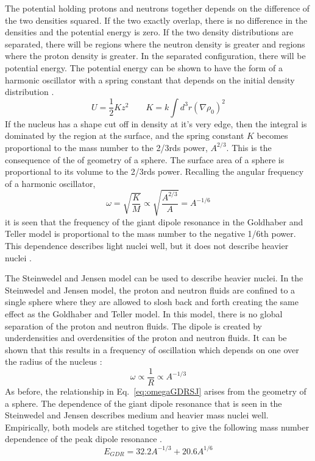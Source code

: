     The potential holding protons and neutrons together depends on the 
      difference of the two densities squared.
    If the two exactly overlap, there is no difference in the densities and the
      potential energy is zero.
    If the two density distributions are separated, there will be regions where
      the neutron density is greater and regions where the proton density is 
      greater.
    In the separated configuration, there will be potential energy.
    The potential energy can be shown to have the form of a harmonic oscillator
      with a spring constant that depends on the initial density distribution 
      \cite{emPCite6}.
    \begin{equation}
      U=\frac{1}{2}Kz^{2} \qquad K=k\int d^{3}r\left(\nabla\rho_{0}\right)^{2}
      \label{eq:potEnGDR}
    \end{equation}
    If the nucleus has a shape cut off in density at it's very edge, then the 
      integral is dominated  by the region at the surface, and the spring 
      constant $K$ becomes proportional to the mass number to the 2/3rds power, 
      $A^{2/3}$.
    This is the consequence of the of geometry of a sphere.
    The surface area of a sphere is proportional to its volume to the 2/3rds 
      power.
    Recalling the angular frequency of a harmonic oscillator,
    \begin{equation}
      \omega=\sqrt{\frac{K}{M}} \propto \sqrt{\frac{A^{2/3}}{A}}=A^{-1/6}
      \label{eq:omegaGDR}
    \end{equation}
      it is seen that the frequency of the giant dipole resonance in the 
      Goldhaber and Teller model is proportional to the mass number to the 
      negative 1/6th power.
    This dependence describes light nuclei well, but it does not describe 
      heavier nuclei \cite{emPCite6}.

    The Steinwedel and Jensen model can be used to describe heavier nuclei.
    In the  Steinwedel and Jensen model, the proton and neutron fluids are 
      confined to a single sphere where they are allowed to slosh back and 
      forth creating the same effect as the Goldhaber and Teller model.
    In this model, there is no global separation of the proton and neutron 
      fluids.
    The dipole is created by underdensities and overdensities of the proton and
      neutron fluids.
    It can be shown that this results in a frequency of oscillation which 
      depends on one over the radius of the nucleus \cite{emPCite6}:
    \begin{equation}
      \omega \propto \frac{1}{R} \propto A^{-1/3}
      \label{eq:omegaGDRSJ}
    \end{equation}
    As before, the relationship in Eq.~\ref{eq:omegaGDRSJ} arises from the geometry of a sphere.
    The dependence of the giant dipole resonance that is seen in the Steinwedel 
      and Jensen describes medium and heavier mass nuclei well.
    Empirically, both models are stitched together to give the following mass 
      number dependence of the peak dipole resonance \cite{emPCite6}.
    \begin{equation}
      E_{GDR}=32.2A^{-1/3}+20.6A^{1/6}
      \label{eq:enGDR}
    \end{equation}
    
